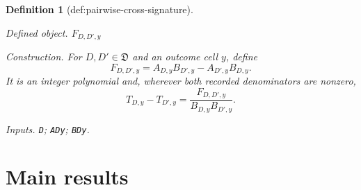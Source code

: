 \documentclass{article}
\newtheorem{definition}{Definition}
\begin{document}
\begin{definition}[def:pairwise-cross-signature]\label{def:pairwise-cross-signature}
\par\smallskip\noindent\emph{Defined object.} \(F_{D,D',y}\)
\par\smallskip\noindent\emph{Construction.} For \(D,D'\in\mathfrak D\) and an outcome cell \(y\), define
\[
 F_{D,D',y}=A_{D,y}B_{D',y}-A_{D',y}B_{D,y}.
\]
It is an integer polynomial and, wherever both recorded denominators are nonzero,
\[
 T_{D,y}-T_{D',y}=\frac{F_{D,D',y}}{B_{D,y}B_{D',y}}.
\]
\par\smallskip\noindent\emph{Inputs.} \texttt{D}; \texttt{ADy}; \texttt{BDy}.
\end{definition}

\section{Main results}
\end{document}
